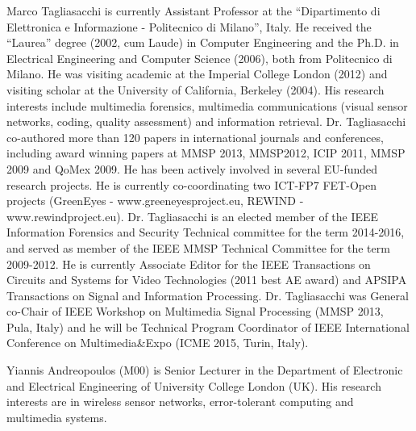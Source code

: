 \documentclass[twocolumn,english]{IEEEtran}
\theoremstyle{plain}
\theoremstyle{definition}
\begin{document}
\vfill
\vfill
\vfill
\vfill
\vfill
\vfill  

                \begin{biography}{Marco Tagliasacchi}
                        is currently Assistant Professor at the ``Dipartimento di Elettronica e Informazione - Politecnico di Milano'', Italy. He received the ``Laurea'' degree (2002, cum Laude) in Computer Engineering and the Ph.D. in Electrical Engineering and Computer Science (2006), both from Politecnico di Milano. He was visiting academic at the Imperial College London (2012) and visiting scholar at the University of California, Berkeley (2004).
His research interests include multimedia forensics, multimedia communications (visual sensor networks, coding, quality assessment) and information retrieval. Dr. Tagliasacchi co-authored more than 120 papers in international journals and conferences, including award winning papers at MMSP 2013, MMSP2012, ICIP 2011, MMSP 2009 and QoMex 2009. He has been actively involved in several EU-funded research projects. He is currently co-coordinating two ICT-FP7 FET-Open projects (GreenEyes - www.greeneyesproject.eu, REWIND - www.rewindproject.eu).
Dr. Tagliasacchi is an elected member of the IEEE Information Forensics and Security Technical committee for the term 2014-2016, and served as member of the IEEE MMSP Technical Committee for the term 2009-2012. He is currently Associate Editor for the IEEE Transactions on Circuits and Systems for Video Technologies (2011 best AE award) and APSIPA Transactions on Signal and Information Processing. Dr. Tagliasacchi was General co-Chair of IEEE Workshop on Multimedia Signal Processing (MMSP 2013, Pula, Italy) and he will be Technical Program Coordinator of IEEE International Conference on Multimedia\&Expo (ICME 2015, Turin, Italy).
                \end{biography}
                
                                                                \begin{biography}{Yiannis Andreopoulos} (M00) is Senior Lecturer in the Department of Electronic and Electrical Engineering of University College London (UK). His research interests are in wireless sensor networks, error-tolerant computing and multimedia systems.
                \end{biography}

                
\end{document}
